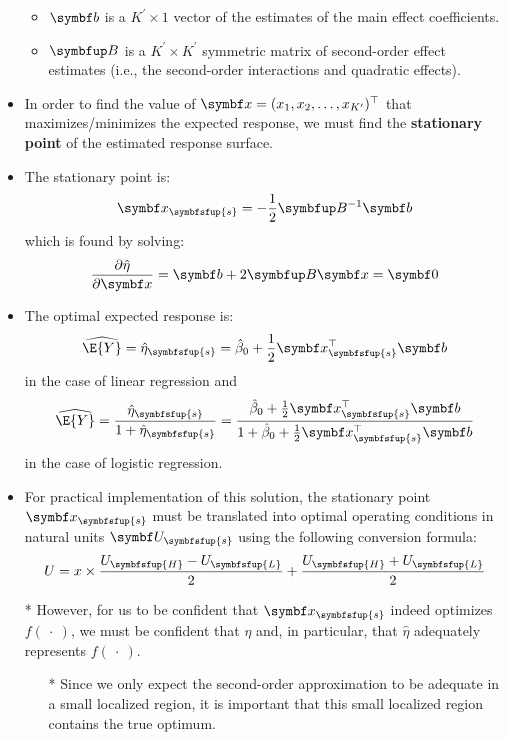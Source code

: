 \begin{itemize}
\begin{itemize}
              \item $ \Vector{b} $ is a $ K^\prime \times 1 $ vector of the estimates of the main effect coefficients.
              \item $ \Matrix{B} $ is a $ K^\prime \times K^\prime $ symmetric matrix of second-order effect estimates
                    (i.e., the second-order interactions and quadratic effects).
          \end{itemize}
    \item In order to find the value of $ \Vector{x}=(x_1,x_2,\ldots,x_{K^\prime})^\top $ that maximizes/minimizes the expected response,
          we must find the \textbf{stationary point} of the estimated response surface.
    \item The stationary point is:
          \[ \Vector{x}_{\symbfsfup{s}}=-\frac{1}{2} \Matrix{B}^{-1}\Vector{b} \]
          which is found by solving:
          \[ \pdv{\hat{\eta}}{\Vector{x}}=\Vector{b}+2\Matrix{B}\Vector{x}=\Vector{0} \]
    \item The optimal expected response is:
          \[ \widehat{\E{Y}}=\hat{\eta}_{\symbfsfup{s}}=\hat{\beta}_0+\frac{1}{2} \Vector{x}^\top_{\symbfsfup{s}} \Vector{b} \]
          in the case of linear regression and
          \[ \widehat{\E{Y}}=\frac{\exp{\hat{\eta}_{\symbfsfup{s}}}}{1+\exp{\hat{\eta}_{\symbfsfup{s}}}}
              =\frac{\exp{\hat{\beta}_0+\frac{1}{2} \Vector{x}^\top_{\symbfsfup{s}} \Vector{b}}}{1+\exp{\hat{\beta}_0+\frac{1}{2} \Vector{x}^\top_{\symbfsfup{s}} \Vector{b}}} \]
          in the case of logistic regression.
    \item For practical implementation of this solution, the stationary point $ \Vector{x}_{\symbfsfup{s}} $ must be translated into optimal
          operating conditions in natural units $ \Vector{U}_{\symbfsfup{s}} $ using the following conversion formula:
          \[ U=x\times \frac{U_{\symbfsfup{H}}-U_{\symbfsfup{L}}}{2}+\frac{U_{\symbfsfup{H}}+U_{\symbfsfup{L}}}{2}  \]
    \item[*] However, for us to be confident that $ \Vector{x}_{\symbfsfup{s}} $ indeed optimizes $ f(\:\cdot\:) $, we must be confident that $ \eta $ and, in particular,
        that $ \hat{\eta} $ adequately represents $ f(\:\cdot\:) $.
        \begin{itemize}
            \item[*] Since we only expect the second-order approximation to be adequate in a small localized region,
                it is important that this small localized region contains the true optimum.

\end{itemize}
\end{itemize}
